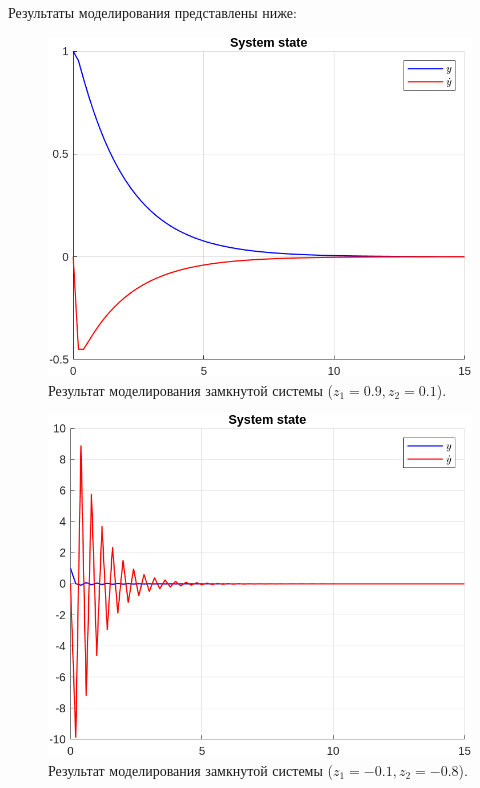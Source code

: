 \documentclass[a4paper, 14pt]{extarticle}
\theoremstyle{definition}
\theoremstyle{plain}
\theoremstyle{remark}
\begin{document}
Результаты моделирования представлены ниже:
\begin{figure}
    [H]
    \centering
    \includegraphics[width=350pt]{images/task2_d__1_state.png}
    \caption{Результат моделирования замкнутой системы ($z_1=0.9, z_2=0.1$).}
\end{figure}
\begin{figure}
    [H]
    \centering
    \includegraphics[width=350pt]{images/task2_d__2_state.png}
    \caption{Результат моделирования замкнутой системы ($z_1=-0.1, z_2=-0.8$).}
\end{figure}
\end{document}
